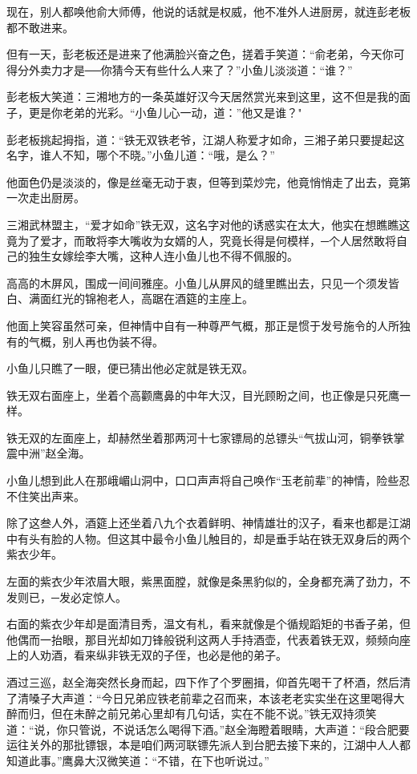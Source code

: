 \documentclass[12pt,oneside]{book}
\begin{document}
现在，别人都唤他俞大师傅，他说的话就是权威，他不准外人进厨房，就连彭老板都不敢进来。

但有一天，彭老板还是进来了他满脸兴奋之色，搓着手笑道：``俞老弟，今天你可得分外卖力才是──你猜今天有些什么人来了？''小鱼儿淡淡道：``谁？''

彭老板大笑道：三湘地方的一条英雄好汉今天居然赏光来到这里，这不但是我的面子，更是你老弟的光彩。``小鱼儿心一动，道：''他又是谁？"

彭老板挑起拇指，道：``铁无双铁老爷，江湖人称爱才如命，三湘子弟只要提起这名字，谁人不知，哪个不晓。''小鱼儿道：``哦，是么？''

他面色仍是淡淡的，像是丝毫无动于衷，但等到菜炒完，他竟悄悄走了出去，竟第一次走出厨房。

三湘武林盟主，``爱才如命''铁无双，这名字对他的诱惑实在太大，他实在想瞧瞧这竟为了爱才，而敢将李大嘴收为女婿的人，究竟长得是何模样，─个人居然敢将自己的独生女嫁绘李大嘴，这种人连小鱼儿也不得不佩服的。

高高的木屏风，围成一间间雅座。小鱼儿从屏风的缝里瞧出去，只见一个须发皆白、满面红光的锦袍老人，高踞在酒筵的主座上。

他面上笑容虽然可亲，但神情中自有一种尊严气概，那正是惯于发号施令的人所独有的气概，别人再也伪装不得。

小鱼儿只瞧了一眼，便已猜出他必定就是铁无双。

铁无双右面座上，坐着个高颧鹰鼻的中年大汉，目光顾盼之间，也正像是只死鹰一样。

铁无双的左面座上，却赫然坐着那两河十七家镖局的总镖头``气拔山河，铜拳铁掌震中洲''赵全海。

小鱼儿想到此人在那峨嵋山洞中，口口声声将自己唤作``玉老前辈''的神情，险些忍不住笑出声来。

除了这叁人外，酒筵上还坐着八九个衣着鲜明、神情雄壮的汉子，看来也都是江湖中有头有脸的人物。但这其中最令小鱼儿触目的，却是垂手站在铁无双身后的两个紫衣少年。

左面的紫衣少年浓眉大眼，紫黑面膛，就像是条黑豹似的，全身都充满了劲力，不发则已，─发必定惊人。

右面的紫衣少年却是面清目秀，温文有札，看来就像是个循规蹈矩的书香子弟，但他偶而一抬眼，那目光却如刀锋般锐利这两人手持酒壶，代表着铁无双，频频向座上的人劝酒，看来纵非铁无双的子侄，也必是他的弟子。

酒过三巡，赵全海突然长身而起，四下作了个罗圈揖，仰首先喝干了杯酒，然后清了清嗓子大声道：``今日兄弟应铁老前辈之召而来，本该老老实实坐在这里喝得大醉而归，但在未醉之前兄弟心里却有几句话，实在不能不说。''铁无双持须笑道：``说，你只管说，不说话怎么喝得下酒。''赵全海瞪着眼睛，大声道：``段合肥要运往关外的那批镖银，本是咱们两河联镖先派人到台肥去接下来的，江湖中人人都知道此事。''鹰鼻大汉微笑道：``不错，在下也听说过。''
\end{document}
